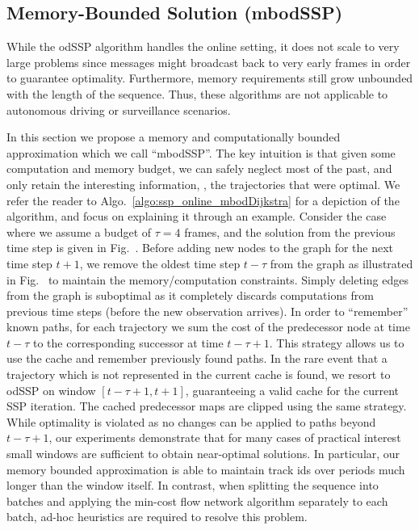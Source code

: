 \documentclass[10pt,twocolumn,letterpaper]{article}
\newcommand{\subfigref}[1]{Fig.~\subref*{#1}}
\newcommand{\algref}[1]{Algo.~\ref{#1}}
\begin{document}
\subsection{Memory-Bounded Solution (mbodSSP)}\label{sec:mbodDijkstra}

While the odSSP algorithm handles the online setting, it does not scale to  very large problems since messages might broadcast back to very early frames in order to guarantee optimality. Furthermore, memory requirements still grow unbounded  with the length of the sequence. 
Thus,  these algorithms are not applicable to autonomous driving or surveillance scenarios.

In this section we propose a memory and computationally bounded approximation which we call ``mbodSSP''. 
The key intuition is that given some computation and memory budget, we can safely neglect  most of the past, and only retain the interesting information, \ie, the trajectories that were optimal. 
We refer the reader to \algref{algo:ssp_online_mbodDijkstra} for a depiction of the algorithm, and focus on explaining it through an example. 
Consider the case where we assume a budget of $\tau=4$ frames, and   the solution from the previous time step is given in \subfigref{fig:odDijkstra:g}. Before adding new nodes to the graph for the next time step $t+1$, we remove the oldest time step $t-\tau$ from the graph as illustrated in \subfigref{fig:odDijkstra:h} to maintain the memory/computation constraints.
Simply deleting edges from the graph is suboptimal as it completely discards computations from  previous time steps (before the new observation arrives).
In order to ``remember'' known paths, for each trajectory we sum the cost of the predecessor node at time $t-\tau$ to the  corresponding successor at time $t-\tau+1$. 
This strategy allows us to use the cache and remember previously found paths.
In the rare event that a trajectory which is not represented in the current cache is found,  we resort to odSSP on window $[t-\tau+1, t+1]$, guaranteeing a valid cache for the current SSP iteration. 
The cached predecessor maps are clipped using the same strategy. 
While optimality is violated as no changes can be applied to paths beyond $t-\tau+1$, our experiments demonstrate that for many cases of practical interest small windows are sufficient to obtain near-optimal solutions. In particular, our memory bounded approximation is able to maintain track ids over periods much longer than the window itself. In contrast, when splitting the sequence into batches and applying the min-cost flow network algorithm separately to each batch, ad-hoc heuristics are required to resolve this problem.
\end{document}
